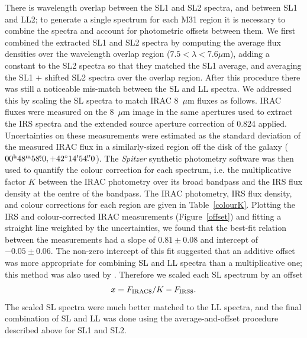 There is wavelength overlap between the SL1 and SL2 spectra, and between SL1 and LL2;
to generate a single spectrum for each M31 region it is necessary to combine the spectra and
account for photometric offsets between them. We first combined the extracted SL1 and SL2 
spectra by computing the average flux densities over the wavelength overlap region ($7.5 < \lambda< 7.6\mu$m),
adding a constant  to the SL2 spectra so that they matched the SL1 average,
and averaging the SL1 $+$ shifted SL2 spectra over the overlap region.
After this procedure there was still a noticeable mis-match between the SL and LL spectra. We addressed this
by scaling the SL spectra to match IRAC 8~$\mu$m fluxes as follows. IRAC fluxes were measured
on the 8~$\mu$m image \citep{Barmby2006lr} in the same apertures used to extract the IRS spectra
and the extended source  aperture correction of 0.824 applied.
Uncertainties on these measurements were estimated as the standard deviation of the measured
IRAC flux in a similarly-sized region off the disk of the galaxy ($00^{\rmn{h}}48^{\rmn{m}}58\fs0, +42\degr14\arcmin54\farcs0$). 
The {\em Spitzer} synthetic photometry software \citep{SpitzerDAC} 
was then used to quantify the colour correction for each spectrum, i.e. the
multiplicative factor $K$ between the IRAC photometry over its broad bandpass and the IRS flux
density at the centre of the bandpass. The IRAC photometry, IRS flux density, and colour corrections 
for each region are given in Table~\ref{colourK}. Plotting the IRS  and colour-corrected IRAC measurements
(Figure~\ref{offset}) and fitting a straight line weighted by the uncertainties, we found that the best-fit relation 
between the measurements had a slope of $0.81\pm0.08$  and intercept of $-0.05\pm0.06$. 
The non-zero intercept of this fit suggested that an additive offset was more appropriate for combining SL and LL
spectra than a multiplicative one; this method was also used by \citet{Sandstrom12}.
Therefore we scaled each SL spectrum by an offset 
\begin{equation}
x = F_{\rm IRAC8}/K -   F_{\rm IRS8}.
\label{eq:offset}
\end{equation}
The scaled SL spectra were much better matched to the LL spectra, and the final combination
of SL and LL was done using the average-and-offset procedure described above for SL1 and SL2.

